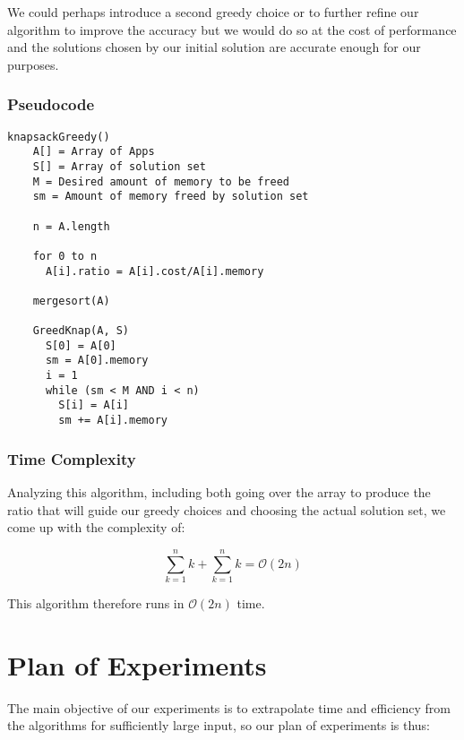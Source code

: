 \documentclass{article}
\begin{document}
We could perhaps introduce a second greedy choice or to further refine our algorithm to improve the accuracy but we would do so at the cost of performance and the solutions chosen by our initial solution are accurate enough for our purposes.

\subsubsection{Pseudocode}
\begin{lstlisting}[mathescape]
knapsackGreedy()
    A[] = Array of Apps
    S[] = Array of solution set
    M = Desired amount of memory to be freed
    sm = Amount of memory freed by solution set

    n = A.length

    for 0 to n
      A[i].ratio = A[i].cost/A[i].memory

    mergesort(A)

    GreedKnap(A, S)
      S[0] = A[0]
      sm = A[0].memory
      i = 1
      while (sm < M AND i < n)
        S[i] = A[i]
        sm += A[i].memory
\end{lstlisting}

\subsubsection{Time Complexity}
Analyzing this algorithm, including both going over the array to produce the ratio that will guide our greedy choices and choosing the actual solution set, we come up with the complexity of:

\begin{equation}
    \sum _{k = 1} ^{n} k + \sum _{k = 1} ^{n} k = \mathcal{O}(2n)
\end{equation}

This algorithm therefore runs in $\mathcal{O}(2n)$ time.

\section{Plan of Experiments}
The main objective of our experiments is to extrapolate time and efficiency from the algorithms for sufficiently large input, so our plan of experiments is thus:
\end{document}
